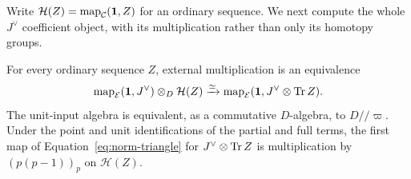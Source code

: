 Write $\mathcal H(Z)=\operatorname{map}_{\mathcal C}(\mathbf 1,Z)$ for an ordinary sequence.
We next compute the whole $J^\vee$ coefficient object, with its
multiplication rather than only its homotopy groups.

\begin{lemma}
\label{layer:coefficient-algebra}
For every ordinary sequence $Z$, external multiplication is an
equivalence
\begin{equation}
 \label{layer:external-product}
 \operatorname{map}_{\mathcal E}(\mathbf 1,J^\vee)\otimes_D\mathcal H(Z)
 \xrightarrow{\simeq}
 \operatorname{map}_{\mathcal E}(\mathbf 1,J^\vee\otimes\operatorname{Tr} Z).
\end{equation}
The unit-input algebra is equivalent, as a commutative $D$-algebra,
to $D//\varpi$. Under the point and unit identifications of the
partial and full terms, the first map of
Equation~\eqref{eq:norm-triangle} for $J^\vee\otimes\operatorname{Tr} Z$ is
multiplication by $(p(p-1))_p$ on $\mathcal H(Z)$.
\end{lemma}


